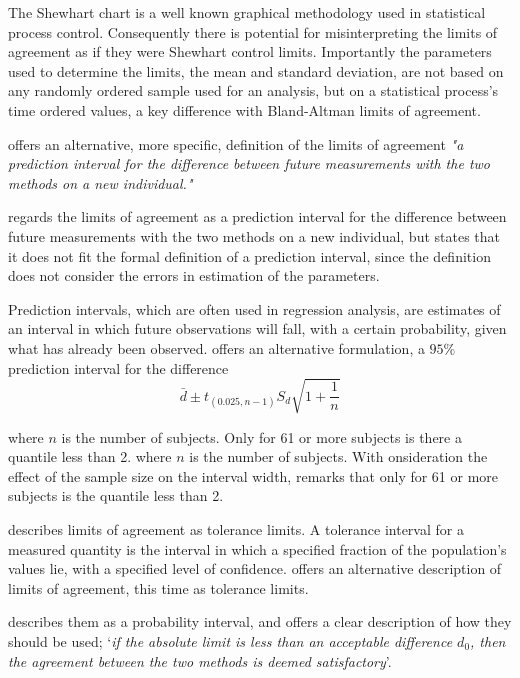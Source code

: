 \documentclass[12pt, a4paper]{report}
\theoremstyle{plain}
\theoremstyle{definition}
\theoremstyle{remark}
\begin{document}
The Shewhart chart is a well known graphical
methodology used in statistical process control. Consequently
there is potential for misinterpreting the limits of agreement as
if they were Shewhart control limits. Importantly the
parameters used to determine the limits, the mean and standard
deviation, are not based on any  randomly ordered sample used for an analysis, but on a statistical process's time ordered values, a key difference with Bland-Altman limits of agreement.

\citet{BXC2008} offers an alternative, more specific,  definition of
the limits of agreement \emph{"a prediction interval for the
	difference between future measurements with the two methods on a
	new individual."}

\citet{BXC2008} regards the limits of agreement as a prediction
interval for the difference between future measurements with the
two methods on a new individual, but states that it does not fit
the formal definition of a prediction interval, since the
definition does not consider the errors in estimation of the
parameters. 

Prediction intervals, which are often used in
regression analysis, are estimates of an interval in which future
observations will fall, with a certain probability, given what has
already been observed. \citet{BXC2008} offers an alternative
formulation, a $95\%$ prediction interval for the difference
\begin{equation}
\bar{d} \pm t_{(0.025, n-1)}S_{d} \sqrt{1+\frac{1}{n}}
\end{equation}

\noindent where $n$ is the number of subjects. Only for 61 or more
subjects is there a quantile less than 2.
\noindent where $n$ is the number of subjects. With onsideration the effect of the sample size on the interval
width, \citet{BXC2008} remarks that only for 61 or more subjects is the quantile less than 2.

\citet{luiz} describes limits of agreement as tolerance limits. A
tolerance interval for a measured quantity is the interval in
which a specified fraction of the population's values lie, with a
specified level of confidence. \citet{luiz} offers an alternative description of limits of agreement, this time as tolerance limits. 

\citet{Barnhart} describes them as a probability interval, and offers a clear description of how they should be used; `\textit{if the absolute limit is less than an acceptable difference $d_{0}$, then the agreement between the two methods is deemed satisfactory}'.
\end{document}
